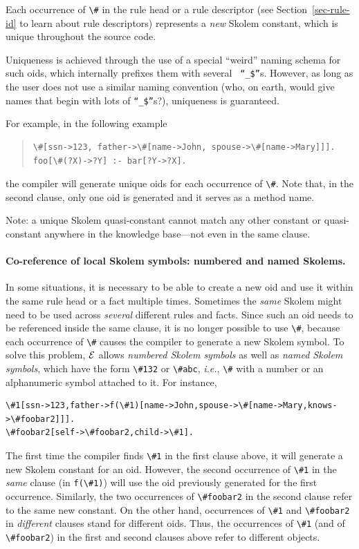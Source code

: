 \documentclass[11pt]{article}
\newcommand{\ERGO}{\mbox{\ensuremath{\cal{E}}\smaller{{\sc{RGO}}}}\xspace}
\newcommand{\FLSYSTEM}{\ERGO}
\newcommand{\bs}{\textbackslash}
\begin{document}
Each occurrence of \verb|\#| in the rule head or a rule descriptor (see
Section~\ref{sec-rule-id} to learn about rule descriptors)
represents a \emph{new} Skolem constant, which is unique throughout
the source code.

Uniqueness is achieved through the use of a special ``weird'' naming
schema for such oids, which internally prefixes them with several {\tt
  ``\_\$''}s. However, as long as the user does not use a similar
naming convention (who, on earth, would give names that begin with lots of
{\tt ``\_\$''}s?), uniqueness is guaranteed.


For example, in the following example
\begin{quote}
\begin{verbatim}
\#[ssn->123, father->\#[name->John, spouse->\#[name->Mary]]].
foo[\#(?X)->?Y] :- bar[?Y->?X].
\end{verbatim}
\end{quote}
the compiler will generate unique oids for each occurrence of {\tt \bs{}\#}.
Note that, in the second clause, only one oid is generated and it serves as
a method name.

Note: a unique Skolem quasi-constant cannot match any other constant or
quasi-constant anywhere in the knowledge base---not even in the same
clause.


\paragraph{Co-reference of local Skolem symbols: numbered and named Skolems.}
In some situations, it is necessary to be able to create a new oid and use it
within the same rule head or a fact multiple times. Sometimes the \emph{same}
Skolem might need to be used across \emph{several} different rules and facts.
Since such an oid 
needs to be referenced inside the same  clause, it is no longer
possible to use \verb|\#|, because each occurrence of \verb|\#| causes the
compiler to generate a new Skolem symbol.
To solve this problem, \FLSYSTEM allows 
\emph{numbered Skolem symbols} as well as \emph{named Skolem symbols},
which have the form \verb|\#132| or \verb|\#abc|, {\it i.e.}, \verb|\#|
with a number or an alphanumeric symbol attached to it. For instance, 
\begin{verbatim}
\#1[ssn->123,father->f(\#1)[name->John,spouse->\#[name->Mary,knows->\#foobar2]]].
\#foobar2[self->\#foobar2,child->\#1].
\end{verbatim}
The first time the compiler finds \verb|\#1| in the first clause above,
it will generate a new Skolem constant for an
oid.
However, the second occurrence of \verb|\#1|
in the \emph{same} clause (in \verb|f(\#1)|)  will use the oid
previously generated for the first occurrence.
Similarly, the two occurrences of \verb|\#foobar2|
in the second clause refer to the same new constant.
On the other hand,
occurrences of \verb|\#1| and \verb|\#foobar2|
in \emph{different} clauses stand for
different oids. Thus, the occurrences of \verb|\#1| (and of \verb|\#foobar2|)
in the first and second
clauses above refer to different objects.
\end{document}
